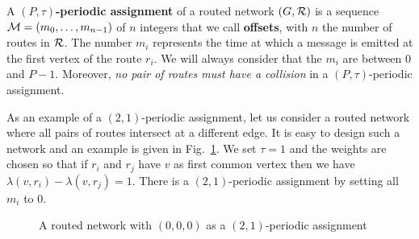 \documentclass[a4paper,10pt]{article}
\begin{document}
      A {\bf $(P,\tau)$-periodic assignment} of a routed network $(G,\cal R)$ is a sequence  ${\cal M}=(m_0, \ldots ,m_{n-1})$ of $n$ integers that we call {\bf offsets}, with $n$ the number of routes in $\cal R$. The number $m_{i}$ represents the time at which a message is emitted at the first vertex of the route $r_{i}$. We will always consider that the $m_{i}$ are between $0$ and $P-1$. Moreover, \emph{no pair of routes must have a collision} in a $(P,\tau)$-periodic assignment.

      As an example of a $(2,1)$-periodic assignment, let us consider a routed network 
      where all pairs of routes intersect at a different edge. It is easy to design such a network and an example is given in Fig.~\ref{fig:example}. We set $\tau = 1$ and the weights are chosen so that if $r_{i}$ and $r_{j}$ have $v$ as first common vertex then we have $\lambda(v,r_{i}) - \lambda(v,r_{j})=1$. There is a $(2,1)$-periodic assignment by setting all $m_{i}$ to $0$.

  
      \begin{figure}[ht]
      \begin{center}
     \end{center}
       \caption{A routed network with $(0,0,0)$ as a $(2,1)$-periodic assignment}
       \label{fig:example}
      \end{figure}
\end{document}
